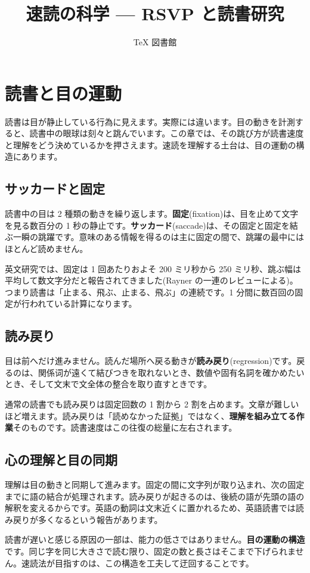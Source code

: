 \documentclass{article}
\title{速読の科学 — RSVP と読書研究}
\author{TeX 図書館}
\begin{document}
\section{読書と目の運動}

読書は目が静止している行為に見えます。実際には違います。目の動きを計測すると、読書中の眼球は刻々と跳んでいます。この章では、その跳び方が読書速度と理解をどう決めているかを押さえます。速読を理解する土台は、目の運動の構造にあります。

\subsection{サッカードと固定}

読書中の目は 2 種類の動きを繰り返します。\textbf{固定}(fixation)は、目を止めて文字を見る数百分の 1 秒の静止です。\textbf{サッカード}(saccade)は、その固定と固定を結ぶ一瞬の跳躍です。意味のある情報を得るのは主に固定の間で、跳躍の最中にはほとんど読めません。

英文研究では、固定は 1 回あたりおよそ 200 ミリ秒から 250 ミリ秒、跳ぶ幅は平均して数文字分だと報告されてきました(Rayner の一連のレビューによる)。つまり読書は「止まる、飛ぶ、止まる、飛ぶ」の連続です。1 分間に数百回の固定が行われている計算になります。

\subsection{読み戻り}

目は前へだけ進みません。読んだ場所へ戻る動きが\textbf{読み戻り}(regression)です。戻るのは、関係词が遠くて結びつきを取れないとき、数値や固有名詞を確かめたいとき、そして文末で文全体の整合を取り直すときです。

通常の読書でも読み戻りは固定回数の 1 割から 2 割を占めます。文章が難しいほど増えます。読み戻りは「読めなかった証拠」ではなく、\textbf{理解を組み立てる作業}そのものです。読書速度はこの往復の総量に左右されます。

\subsection{心の理解と目の同期}

理解は目の動きと同期して進みます。固定の間に文字列が取り込まれ、次の固定までに語の結合が処理されます。読み戻りが起きるのは、後続の語が先頭の語の解釈を変えるからです。英語の動詞は文末近くに置かれるため、英語読書では読み戻りが多くなるという報告があります。

読書が遅いと感じる原因の一部は、能力の低さではありません。\textbf{目の運動の構造}です。同じ字を同じ大きさで読む限り、固定の数と長さはそこまで下げられません。速読法が目指すのは、この構造を工夫して迂回することです。
\end{document}

